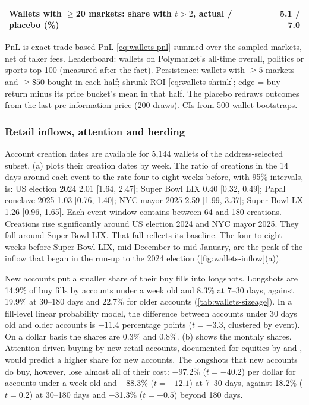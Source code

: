 \begin{table}[t]
\begin{threeparttable}
\begin{tabular}{lr}
Wallets with $\geq$20 markets: share with $t>2$, actual / placebo (\%) & 5.1 / 7.0 \\
\bottomrule
\end{tabular}
\begin{tablenotes}\footnotesize
\item PnL is exact trade-based PnL \eqref{eq:wallets-pnl} summed over the sampled markets, net of taker fees.
  Leaderboard: wallets on Polymarket's all-time overall, politics or sports top-100 (measured after the
  fact). Persistence: wallets with $\geq5$ markets and $\geq\$50$ bought in each half; shrunk ROI
  \eqref{eq:wallets-shrink}; edge = buy return minus its price bucket's mean in that half. The placebo redraws
  outcomes from the last pre-information price (200 draws). CIs from 500 wallet bootstraps.
\end{tablenotes}
\end{threeparttable}
\end{table}

\subsubsection{Retail inflows, attention and herding}\label{sec:res-wallets-dyn}

Account creation dates are available for 5{,}144 wallets of the address-selected subset.
(a) plots their creation dates by week. The ratio of creations in the 14 days around each
event to the rate four to eight weeks before, with 95\% intervals, is: US election 2024 2.01 [1.64, 2.47]; Super Bowl LIX 0.40 [0.32, 0.49]; Papal conclave 2025 1.03 [0.76, 1.40]; NYC mayor 2025 2.59 [1.99, 3.37]; Super Bowl LX 1.26 [0.96, 1.65]. Each event window contains between 64 and
180 creations. Creations rise significantly around US election 2024 and NYC mayor 2025. They fall around Super Bowl LIX. That fall reflects its baseline. The four to eight weeks before Super Bowl LIX, mid-December to mid-January, are the peak of the inflow that began in the run-up to the 2024 election (\cref{fig:wallets-inflow}(a)).

New accounts put a smaller share of their buy fills into longshots. Longshots are 14.9\% of buy fills by accounts under a week old and
8.3\% at 7--30 days, against 19.9\% at 30--180 days and
22.7\% for older accounts (\cref{tab:wallets-sizeage}). In a fill-level linear probability model,
the difference between accounts under 30 days old and older accounts is $-$11.4 percentage points
($t=-3.3$, clustered by event). On a dollar basis the shares are 0.3\% and 0.8\%.
(b) shows the monthly shares. Attention-driven buying by new retail accounts,
documented for equities by \citet{barberodean2008} and \citet{barber2022}, would predict a higher share
for new accounts. The longshots that new accounts do buy, however, lose almost all of their cost:
$-$97.2\% ($t=-40.2$) per dollar for accounts under a week old and $-$88.3\% ($t=-12.1$) at
7--30 days, against 18.2\% ($t=0.2$) at 30--180 days and $-$31.3\% ($t=-0.5$) beyond
180 days.

